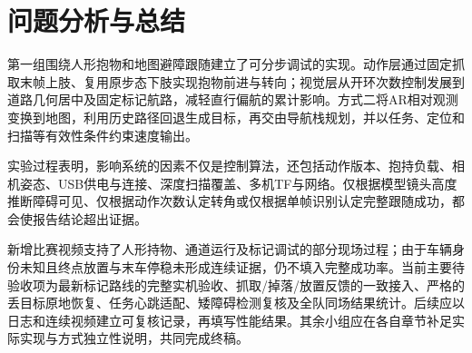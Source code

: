 \section{问题分析与总结}
第一组围绕人形抱物和地图避障跟随建立了可分步调试的实现。动作层通过固定抓取末帧上肢、复用原步态下肢实现抱物前进与转向；视觉层从开环次数控制发展到道路几何居中及固定标记航路，减轻直行偏航的累计影响。方式二将AR相对观测变换到地图，利用历史路径回退生成目标，再交由导航栈规划，并以任务、定位和扫描等有效性条件约束速度输出。

实验过程表明，影响系统的因素不仅是控制算法，还包括动作版本、抱持负载、相机姿态、USB供电与连接、深度扫描覆盖、多机TF与网络。仅根据模型镜头高度推断障碍可见、仅根据动作次数认定转角或仅根据单帧识别认定完整跟随成功，都会使报告结论超出证据。

新增比赛视频支持了人形持物、通道运行及标记调试的部分现场过程；由于车辆身份未知且终点放置与末车停稳未形成连续证据，仍不填入完整成功率。当前主要待验收项为最新标记路线的完整实机验收、抓取/掉落/放置反馈的一致接入、严格的丢目标原地恢复、任务心跳适配、矮障碍检测复核及全队同场结果统计。后续应以日志和连续视频建立可复核记录，再填写性能结果。其余小组应在各自章节补足实际实现与方式独立性说明，共同完成终稿。
